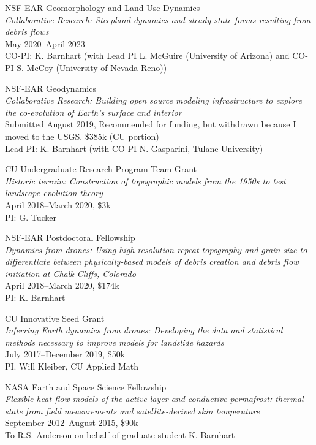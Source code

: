 \documentclass[10pt]{article}
\begin{document}
\begin{outerlist}
	\item 
	NSF-EAR Geomorphology and Land Use Dynamics\\ 
	\textit{Collaborative Research: Steepland dynamics and steady-state forms resulting from debris flows}\\
	May 2020--April 2023\\
	CO-PI: K. Barnhart (with Lead PI L. McGuire (University of Arizona) and CO-PI S. McCoy (University of Nevada Reno))
	
	\item NSF-EAR Geodynamics\\ 
	\textit{Collaborative Research: Building open source modeling infrastructure to explore the co-evolution of Earth's surface and interior}\\
	Submitted August 2019, Recommended for funding, but withdrawn because I moved to the USGS. \$385k (CU portion)\\
	Lead PI: K. Barnhart (with CO-PI N. Gasparini, Tulane University)
	
	\item CU Undergraduate Research Program Team Grant\\
	\textit{Historic terrain: Construction of topographic models from the 1950s to test landscape evolution theory}\\
	April 2018--March 2020, \$3k\\
	PI: G. Tucker
	
	\item NSF-EAR Postdoctoral Fellowship\\ 
	\textit{Dynamics from drones: Using high-resolution repeat topography and grain size to differentiate between physically-based models of debris creation and debris flow initiation at Chalk Cliffs, Colorado}\\
	April 2018--March 2020, \$174k\\
	PI: K. Barnhart
	
	\item CU Innovative Seed Grant\\ 
	\textit{Inferring Earth dynamics from drones:  Developing the data and statistical methods necessary to improve models for landslide hazards}\\
	July 2017--December 2019, \$50k\\
	PI. Will Kleiber, CU Applied Math
	
	\item NASA Earth and Space Science Fellowship\\ 
	\textit{Flexible heat flow models of the active layer and conductive permafrost: thermal state from field measurements and satellite-derived skin temperature} 
	\\September 2012--August 2015, \$90k
	\\To R.S. Anderson on behalf of graduate student K. Barnhart
	

\end{outerlist}
\end{document}
